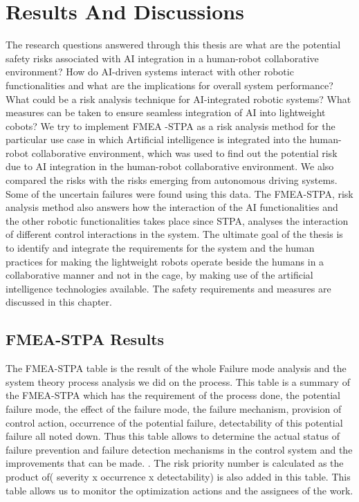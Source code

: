 {\section {Results And Discussions}{{\normalfont\fontsize{14}{16}\bfseries}}

The research questions answered through this thesis are what are the potential safety risks associated with AI integration in a human-robot collaborative environment? How do AI-driven systems interact with other robotic functionalities and what are the implications for overall system performance? What could be a risk analysis technique for AI-integrated robotic systems? What measures can be taken to ensure seamless integration of AI into lightweight cobots? We try to implement FMEA -STPA as a risk analysis method for the particular use case in which Artificial intelligence is integrated into the human-robot collaborative environment, which was used to find out the potential risk due to AI integration in the human-robot collaborative environment. We also compared the risks with the risks emerging from autonomous driving systems. Some of the uncertain failures were found using this data. The FMEA-STPA, risk analysis method also answers how the interaction of the AI functionalities and the other robotic functionalities takes place since STPA, analyses the interaction of different control interactions in the system. The ultimate goal of the thesis is to identify and integrate the requirements for the system and the human practices for making the lightweight robots operate beside the humans in a collaborative manner and not in the cage, by making use of the artificial intelligence technologies available. The safety requirements and measures are discussed in this chapter.


{\subsection{FMEA-STPA Results }}

The FMEA-STPA table is the result of the whole Failure mode analysis and the system theory process analysis we did on the process. This table is a summary of the FMEA-STPA which has the requirement of the process done, the potential failure mode, the effect of the failure mode, the failure mechanism, provision of control action, occurrence of the potential failure, detectability of this potential failure all noted down.  
Thus this table allows to determine the actual status of failure prevention and failure detection mechanisms in the control system and the improvements that can be made. .  The risk priority number is calculated as the product of( severity x occurrence x detectability) is also added in this table. This table allows us to monitor the optimization actions and the assignees of the work.

}
